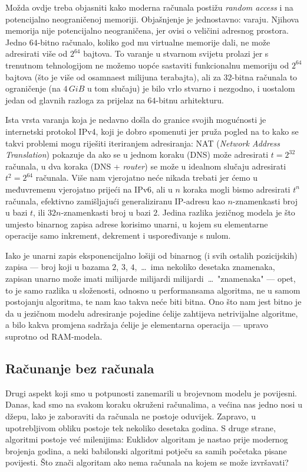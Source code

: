 Možda ovdje treba objasniti kako moderna računala postižu \emph{random access} i na potencijalno neograničenoj memoriji. Objašnjenje je jednostavno: varaju. Njihova memorija nije potencijalno neograničena, jer ovisi o veličini adresnog prostora. Jedno $64$-bitno računalo, koliko god mu virtualne memorije dali, ne može adresirati više od $2^{64}$ bajtova. To varanje u stvarnom svijetu prolazi jer s trenutnom tehnologijom ne možemo uopće sastaviti funkcionalnu memoriju od $2^{64}$ bajtova (što je više od osamnaest milijuna terabajta), ali za $32$-bitna računala to ograničenje (na $4\,GiB$ u tom slučaju) je bilo vrlo stvarno i nezgodno, i uostalom jedan od glavnih razloga za prijelaz na $64$-bitnu arhitekturu.

Ista vrsta varanja koja je nedavno došla do granice svojih mogućnosti je internetski protokol IPv4, koji je dobro spomenuti jer pruža pogled na to kako se takvi problemi mogu riješiti iteriranjem adresiranja: NAT (\emph{Network Address Translation}) pokazuje da ako se u jednom koraku (DNS) može adresirati $t=2^{32}$ računala, u dva koraka (DNS + \emph{router}) se može u idealnom slučaju adresirati $t^2=2^{64}$ računala. Više nam vjerojatno neće nikada trebati jer ćemo u međuvremenu vjerojatno prijeći na IPv6, ali u $n$ koraka mogli bismo adresirati $t^n$ računala, efektivno zamišljajući generaliziranu IP-adresu kao $n$-znamenkasti broj u bazi $t$, ili $32n$-znamenkasti broj u bazi $2$. Jedina razlika jezičnog modela je što umjesto binarnog zapisa adrese korisimo unarni, u kojem su elementarne operacije samo inkrement, dekrement i  uspoređivanje s nulom.

Iako je unarni zapis eksponencijalno lošiji od binarnog (i svih ostalih pozicijskih) zapisa --- broj koji u bazama $2$, $3$, $4$,~\ldots\ ima nekoliko desetaka znamenaka, zapisan unarno može imati milijarde milijardi milijardi~\ldots\ "znamenaka" --- opet, to je samo razlika u složenosti, odnosno u performansama algoritma, ne u samom postojanju algoritma, te nam kao takva neće biti bitna. Ono što nam jest bitno je da u jezičnom modelu adresiranje pojedine ćelije zahtijeva netrivijalne algoritme, a bilo kakva promjena sadržaja ćelije je elementarna operacija --- upravo suprotno od RAM-modela.

\subsection{Računanje bez računala}

Drugi aspekt koji smo u potpunosti zanemarili u brojevnom modelu je povijesni. Danas, kad smo na svakom koraku okruženi računalima, a većina nas jedno nosi u džepu, lako je zaboraviti da računala ne postoje oduvijek. Zapravo, u upotrebljivom obliku postoje tek nekoliko desetaka godina. S druge strane, algoritmi postoje već milenijima: Euklidov algoritam je nastao prije modernog brojenja godina, a neki babilonski algoritmi potječu sa samih početaka pisane povijesti. Što znači algoritam ako nema računala na kojem se može izvršavati?

